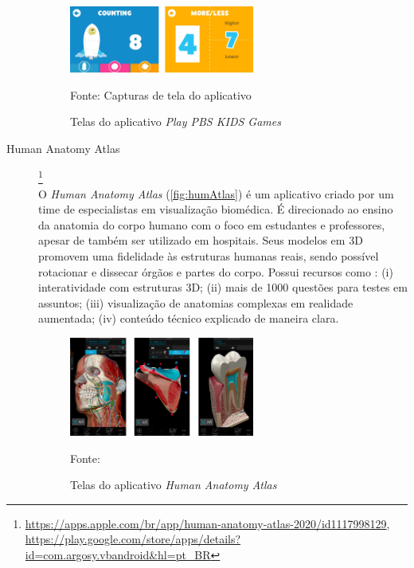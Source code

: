 \begin{description}
\begin{figure}[H]
\centering
    \caption{Telas do aplicativo \textit{Play PBS KIDS Games}}
    \label{fig:pbs}
    \includegraphics[width=0.6\textwidth]{Figuras/pbsKids.jpg}
    
    Fonte: Capturas de tela do aplicativo
\end{figure}

\item[Human Anatomy Atlas]\footnote{\url{https://apps.apple.com/br/app/human-anatomy-atlas-2020/id1117998129}, \url{https://play.google.com/store/apps/details?id=com.argosy.vbandroid&hl=pt_BR}} \hfill \\
O \textit{Human Anatomy Atlas} (\autoref{fig:humAtlas}) é um aplicativo criado por um time de especialistas em visualização biomédica. É direcionado ao ensino da anatomia do corpo humano com o foco em estudantes e professores, apesar de também ser utilizado em hospitais. Seus modelos em 3D promovem uma fidelidade às estruturas humanas reais, sendo possível rotacionar e dissecar órgãos e partes do corpo. Possui recursos como : (i) interatividade com estruturas 3D; (ii) mais de 1000 questões para testes em assuntos; (iii) visualização de anatomias complexas em realidade aumentada; (iv) conteúdo técnico explicado de maneira clara.

\begin{figure}[ht!]
\centering
    \caption{Telas do aplicativo \textit{Human Anatomy Atlas}}
    \label{fig:humAtlas}
    \includegraphics[width=0.6\textwidth]{Figuras/humanAtlas.png}
    
    Fonte: \cite{HumanAnatomyAtlas}
\end{figure}


\end{description}
